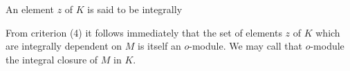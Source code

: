 An element $z$ of $K$ is said to be integrally

From criterion (4) it follows immediately that the set of elements $z$ of $K$ which are integrally dependent on $M$ is itself an $o$-module. We may call that $o$-module the integral closure of $M$ in $K$.